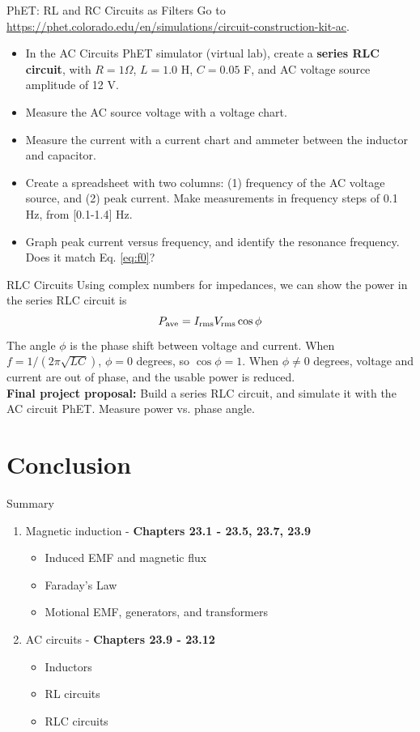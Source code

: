 \documentclass{beamer}
\begin{document}
\begin{frame}{PhET: RL and RC Circuits as Filters}
\footnotesize
Go to \url{https://phet.colorado.edu/en/simulations/circuit-construction-kit-ac}.
\begin{itemize}
\footnotesize
\item In the AC Circuits PhET simulator (virtual lab), create a \textbf{\alert{series RLC circuit}}, with $R = 1 \Omega$, $L = 1.0$ H, $C = 0.05$ F, and AC voltage source amplitude of 12 V.
\item Measure the AC source voltage with a voltage chart.
\item Measure the current with a current chart and ammeter between the inductor and capacitor.
\item Create a spreadsheet with two columns: (1) frequency of the AC voltage source, and (2) peak current.  Make measurements in frequency steps of 0.1 Hz, from [0.1-1.4] Hz.
\item Graph peak current versus frequency, and identify the resonance frequency.  Does it match Eq. \ref{eq:f0}?
\end{itemize}
\end{frame}

\begin{frame}{RLC Circuits}
Using complex numbers for impedances, we can show the power in the series RLC circuit is
\begin{equation}
P_{\rm ave} = I_{\rm rms} V_{\rm rms} \cos\phi
\end{equation}
The angle $\phi$ is the phase shift between voltage and current.  When $f = 1/(2\pi\sqrt{LC})$, $\phi = 0$ degrees, so $\cos\phi = 1$.  When $\phi \neq 0$ degrees, voltage and current are out of phase, and the usable power is reduced. \\ \vspace{1cm}
\textbf{\alert{Final project proposal:}} Build a series RLC circuit, and simulate it with the AC circuit PhET.  Measure power vs. phase angle.
\end{frame}

\section{Conclusion}

\begin{frame}{Summary}
\begin{enumerate}
\item Magnetic induction - \textbf{Chapters 23.1 - 23.5, 23.7, 23.9}
\begin{itemize}
\item Induced EMF and magnetic flux
\item Faraday's Law
\item Motional EMF, generators, and transformers
\end{itemize}
\item AC circuits - \textbf{Chapters 23.9 - 23.12}
\begin{itemize}
\item Inductors
\item RL circuits
\item RLC circuits
\end{itemize}
\end{enumerate}
\end{frame}
\end{document}
